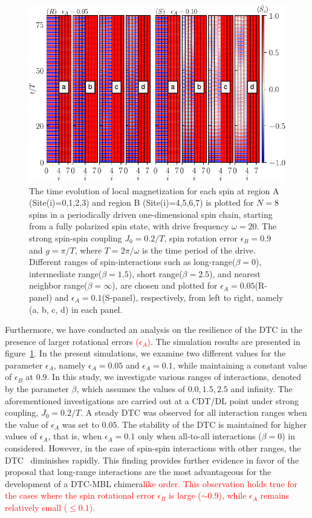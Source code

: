 \documentclass[12pt]{iopart}
\newcommand{\red}[1]{\textcolor{red}{#1}}
\begin{document}
\begin{figure}[t]
\centering
\hspace{1.5cm}\includegraphics[width=12cm]{figure6.pdf}
\caption{The time evolution of local magnetization for each spin at region A (Site(i)=0,1,2,3) and region B (Site(i)=4,5,6,7) is plotted for $N=8$ spins in a periodically driven one-dimensional spin chain, starting from a fully polarized spin state, with drive frequency $\omega=20$. The strong spin-spin coupling $J_0 = 0.2/T$, spin rotation error $\epsilon_B = 0.9$ and $g=\pi/T$, where $T=2\pi/\omega$ is the time period of the drive.  Different ranges of spin-interactions such as long-range($\beta=0$), intermediate range($\beta=1.5$), short range($\beta=2.5$), and nearest neighbor range($\beta=\infty$), are chosen and plotted  for $\epsilon_A =0.05$(R-panel) and $\epsilon_A =0.1$(S-panel), respectively, from left to right, namely (a, b, c, d) in each panel.}
\label{Fig:ea}
\end{figure}
Furthermore, we have conducted an analysis on the resilience of the DTC in the presence of larger rotational errors \red{($\epsilon_A$)}. The simulation results are presented in figure~\ref{Fig:ea}. In the present simulations, we examine two different values for the parameter $\epsilon_A$, namely $\epsilon_A = 0.05$ and $\epsilon_A = 0.1$, while maintaining a constant value of $\epsilon_B$ at $0.9$. In this study, we investigate various ranges of interactions, denoted by the parameter $\beta$, which assumes the values of $0.0, 1.5, 2.5$ and infinity. The aforementioned investigations are carried out at a CDT/DL point under strong coupling, $J_0 = 0.2/T$.  A steady DTC was observed for all interaction ranges when the value of $\epsilon_A$ was set to $0.05$. The stability of the DTC is maintained for higher values of $\epsilon_A$, that is, when $\epsilon_A = 0.1$ only when all-to-all interactions ($\beta=0$) in considered. However, in the case of spin-spin interactions with other ranges, the DTC  diminishes rapidly. This finding provides further evidence in favor of the proposal that long-range interactions are the most advantageous for the development of a DTC-MBL chimera\red{like order. This observation holds true for the cases where the spin rotational error $\epsilon_B$ is large ($\sim 0.9$), while $\epsilon_A$ remains relatively small ($\le 0.1$).}
\end{document}
